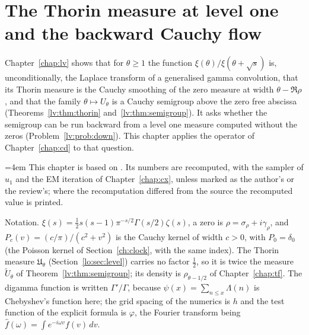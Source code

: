 \chapter{The Thorin measure at level one and the backward Cauchy flow}\label{chap:lo}

Chapter~\ref{chap:lv} shows that for $\theta\ge1$ the function $\xi(\theta)/\xi(\theta+\sqrt s)$ is, unconditionally, the Laplace transform of a generalised gamma convolution, that its Thorin measure is the Cauchy smoothing of the zero measure at width $\theta-\Re\rho$, and that the family $\theta\mapsto U_\theta$ is a Cauchy semigroup above the zero free abscissa (Theorems~\ref{lv:thm:thorin} and~\ref{lv:thm:semigroup}). It asks whether the semigroup can be run backward from a level one measure computed without the zeros (Problem~\ref{lv:prob:down}). This chapter applies the operator of Chapter~\ref{chap:cd} to that question.

{\emergencystretch=4em This chapter is based on \cite{P26lo}. Its numbers are recomputed, with the sampler of $u_1$ and the EM iteration of Chapter~\ref{chap:cx}, unless marked as the author's or the review's; where the recomputation differed from the source the recomputed value is printed.\par}

Notation. $\xi(s)=\tfrac12s(s-1)\pi^{-s/2}\Gamma(s/2)\zeta(s)$, a zero is $\rho=\sigma_\rho+i\gamma_\rho$, and $P_c(v)=(c/\pi)/(c^2+v^2)$ is the Cauchy kernel of width $c>0$, with $P_0=\delta_0$ (the Poisson kernel of Section~\ref{ch:clock}, with the same index). The Thorin measure $\mathfrak U_\theta$ (Section~\ref{lo:sec:level}) carries no factor $\tfrac12$, so it is twice the measure $\widetilde U_\theta$ of Theorem~\ref{lv:thm:semigroup}; its density is $\rho_{\theta-1/2}$ of Chapter~\ref{chap:tf}. The digamma function is written $\Gamma'/\Gamma$, because $\psi(x)=\sum_{n\le x}\Lambda(n)$ is Chebyshev's function here; the grid spacing of the numerics is $h$ and the test function of the explicit formula is $\varphi$, the Fourier transform being $\widehat f(\omega)=\int e^{-i\omega v}f(v)\,dv$.

